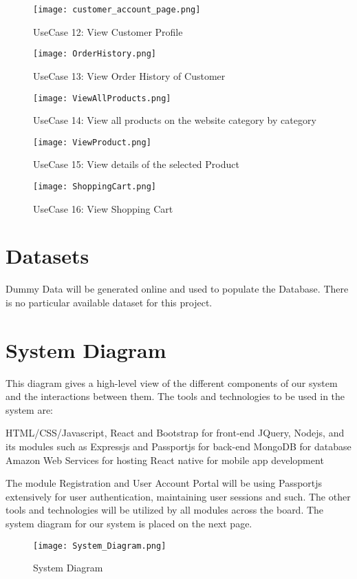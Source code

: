 \begin{figure}
  \caption{UseCase 12: View Customer Profile}
  \texttt{[image: customer\_account\_page.png]}
  \centering
\end{figure}
\begin{figure}
  \caption{UseCase 13: View Order History of Customer}
  \texttt{[image: OrderHistory.png]}
  \centering
\end{figure}
\begin{figure}
  \caption{UseCase 14: View all products on the website category by category}
  \texttt{[image: ViewAllProducts.png]}
  \centering
\end{figure}
\begin{figure}
  \caption{UseCase 15: View details of the selected Product}
  \texttt{[image: ViewProduct.png]}
  \centering
\end{figure}
\begin{figure}
  \caption{UseCase 16: View Shopping Cart}
  \texttt{[image: ShoppingCart.png]}
  \centering
\end{figure}


\section{Datasets}
Dummy Data will be generated online and used to populate the Database. There is no particular available dataset for this project.

\section{System Diagram}
This diagram gives a high-level view of the different components of our system and the interactions between them.
The tools and technologies to be used in the system are:
\begin{outline}
    \1 HTML/CSS/Javascript, React and Bootstrap for front-end
    \1 JQuery, Nodejs, and its modules such as Expressjs and Passportjs for back-end
    \1 MongoDB for database
    \1 Amazon Web Services for hosting
    \1 React native for mobile app development
\end{outline}
The module Registration and User Account Portal will be using Passportjs extensively for user authentication, maintaining user sessions and such. The other tools and technologies will be utilized by all modules across the board.
    The system diagram for our system is placed on the next page.

\begin{figure}
  \caption{System Diagram}
  \texttt{[image: System\_Diagram.png]}
  \centering
\end{figure}